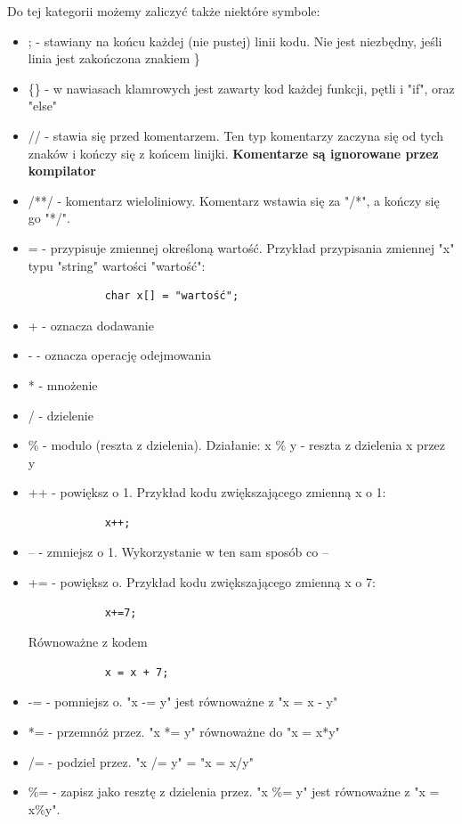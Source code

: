 \documentclass[a4paper,12pt, twoside]{article}
\begin{document}
	Do tej kategorii możemy zaliczyć także niektóre symbole:
	\begin{itemize}
		\item ; - stawiany na końcu każdej (nie pustej) linii kodu. Nie jest niezbędny, jeśli linia jest zakończona znakiem \}
		\item \{\} - w nawiasach klamrowych jest zawarty kod każdej funkcji, pętli i "if", oraz "else"
		\item // - stawia się przed komentarzem. Ten typ komentarzy zaczyna się od tych znaków i kończy się z końcem linijki. \textbf{Komentarze są ignorowane przez kompilator} 
		\item /**/ - komentarz wieloliniowy. Komentarz wstawia się za "/*", a kończy się go "*/".
		\item = - przypisuje zmiennej określoną wartość. Przykład przypisania zmiennej "x" typu "string" wartości "wartość":
			\begin{verbatim}
			char x[] = "wartość";
			\end{verbatim}
		\item + - oznacza dodawanie
		\item - - oznacza operację odejmowania
		\item * - mnożenie
		\item / - dzielenie
		\item \% - modulo (reszta z dzielenia). Działanie: x \% y - reszta z dzielenia x przez y
		\item ++ - powiększ o 1. Przykład kodu zwiększającego zmienną x o 1:
			\begin{verbatim}
			x++;
			\end{verbatim}
		\item -- - zmniejsz o 1. Wykorzystanie w ten sam sposób co --
		\item += - powiększ o. Przykład kodu zwiększającego zmienną x o 7:
			\begin{verbatim}
			x+=7;
			\end{verbatim}
			Równoważne z kodem
			\begin{verbatim}
			x = x + 7;
			\end{verbatim}
		\item -= - pomniejsz o. "x -= y" jest równoważne z "x = x - y"
		\item *= - przemnóż przez. "x *= y" równoważne do "x = x*y"
		\item /= - podziel przez. "x /= y" = "x = x/y"
		\item \%= - zapisz jako resztę z dzielenia przez. "x \%= y" jest równoważne z "x = x\%y".
	\end{itemize}
\end{document}

